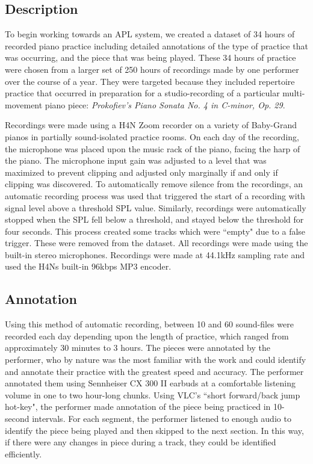 \documentclass{article}
\begin{document}
\subsection{Description}
To begin working towards an APL system, we created a dataset of 34 hours of recorded piano practice including detailed annotations of the type of practice that was occurring, and the piece that was being played.  
These 34 hours of practice were chosen from a larger set of 250 hours of recordings made by one performer over the course of a year. 
They were targeted because they included repertoire practice that occurred in preparation for a studio-recording of a particular multi-movement piano piece: \textit{Prokofiev's Piano Sonata No. 4 in C-minor, Op. 29}. 

Recordings were made using a H4N Zoom recorder on a variety of Baby-Grand pianos in partially sound-isolated practice rooms. 
On each day of the recording, the microphone was placed upon the music rack of the piano, facing the harp of the piano. 
The microphone input gain was adjusted to a level that was maximized to prevent clipping and adjusted only marginally if and only if clipping was discovered. 
To automatically remove silence from the recordings, an automatic recording process was used that triggered the start of a recording with signal level above a threshold SPL value. Similarly, recordings were automatically stopped when the SPL fell below a threshold, and stayed below the threshold for four seconds. This process created some tracks which were ``empty" due to a false trigger. These were removed from the dataset. All recordings were made using the built-in stereo microphones. Recordings were made at 44.1kHz sampling rate and used the H4Ns built-in 96kbps MP3 encoder.

\subsection{Annotation}
Using this method of automatic recording, between 10 and 60 sound-files were recorded each day depending upon the length of practice, which ranged from approximately 30 minutes to 3 hours.
The pieces were annotated by the performer, who by nature was the most familiar with the work and could identify and annotate their practice with the greatest speed and accuracy. 
The performer annotated them using Sennheiser CX 300 II earbuds at a comfortable listening volume in one to two hour-long chunks. 
Using VLC's ``short forward/back jump hot-key", the performer made annotation of the piece being practiced in 10-second intervals. 
For each segment, the performer listened to enough audio to identify the piece being played and then skipped to the next section. 
In this way, if there were any changes in piece during a track, they could be identified efficiently.
\end{document}
